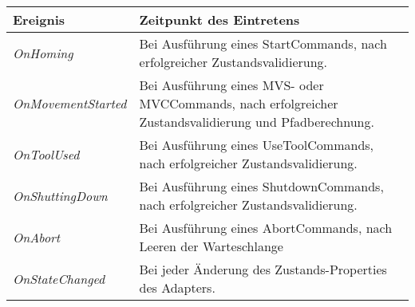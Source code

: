 \begin{tabular}{|p{5cm}|p{9cm}|}
\hline \rowcolor{lightgray}
\textbf{Ereignis} & \textbf{Zeitpunkt des Eintretens}\\
\hline
\textit{OnHoming} & Bei Ausführung eines StartCommands, nach erfolgreicher Zustandsvalidierung.\\
\hline
\textit{OnMovementStarted} & Bei Ausführung eines MVS- oder MVCCommands, nach erfolgreicher Zustandsvalidierung und Pfadberechnung.\\
\hline
\textit{OnToolUsed} & Bei Ausführung eines UseToolCommands, nach erfolgreicher Zustandsvalidierung.\\
\hline
\textit{OnShuttingDown} & Bei Ausführung eines ShutdownCommands, nach erfolgreicher Zustandsvalidierung.\\
\hline
\textit{OnAbort} & Bei Ausführung eines AbortCommands, nach Leeren der Warteschlange\\ 
\hline
\textit{OnStateChanged} & Bei jeder Änderung des Zustands-Properties des Adapters.\\
\hline
\end{tabular}